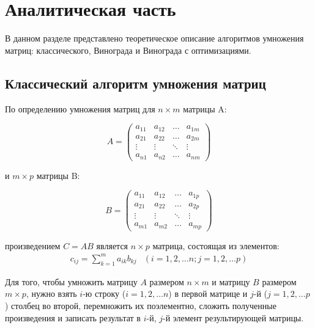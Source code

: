 \chapter{Аналитическая часть}

В данном разделе представлено теоретическое описание алгоритмов умножения матриц: классического, Винограда и Винограда с оптимизациями.

\section{Классический алгоритм умножения матриц}

По определению умножения матриц для $n \times m$ матрицы A:

\begin{equation}
	A = \left(
	\begin{array}{cccc}
		a_{11} & a_{12} & \ldots & a_{1m} \\
		a_{21} & a_{22} & \ldots & a_{2m} \\
		\vdots & \vdots & \ddots & \vdots \\
		a_{n1} & a_{n2} & \ldots & a_{nm}
	\end{array}
	\right)
	\label{eq:ref1}
\end{equation}

и $m \times p$ матрицы B:

\begin{equation}
	B = \left(
	\begin{array}{cccc}
		a_{11} & a_{12} & \ldots & a_{1p} \\
		a_{21} & a_{22} & \ldots & a_{2p} \\
		\vdots & \vdots & \ddots & \vdots \\
		a_{m1} & a_{m2} & \ldots & a_{mp}
	\end{array}
	\right)
	\label{eq:ref2}
\end{equation}

произведением $C=AB$ является $n \times p$ матрица, состоящая из элементов:
\begin{equation}
	\begin{array}{cc}
		c_{ij} = \sum\limits_{k=1}^m a_{ik}b_{kj} & (i=1,2,\dots n; j=1,2,\dots p)
	\end{array}
	\label{eq:ref3}
\end{equation}

Для того, чтобы умножить матрицу $A$ размером $n \times m$ и матрицу $B$ размером $m \times p$, нужно взять $i$-ю строку ($i=1,2,\dots n$) в первой матрице и $j$-й ($j=1,2,\dots p$) столбец во второй, перемножить их поэлементно, сложить полученные произведения и записать результат в $i$-й, $j$-й элемент результирующей матрицы.

